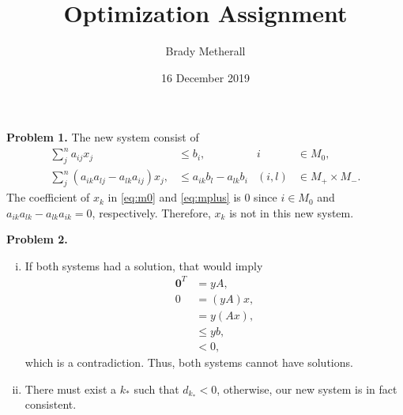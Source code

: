 \documentclass[11pt,a4paper]{article}
\title{Optimization Assignment}
\author{Brady Metherall}
\date{16 December 2019}
\begin{document}
\maketitle


\textbf{Problem 1.}
The new system consist of
\begin{align}
    \sum_j^n a_{ij} x_j &\leq b_i, & i &\in M_0, \label{eq:m0} \\
    \sum_j^n (a_{ik} a_{lj} - a_{lk} a_{ij}) x_j, &\leq a_{ik} b_l - a_{lk} b_i & (i,l) &\in M_+ \times M_-. \label{eq:mplus}
\end{align}
The coefficient of $x_k$ in \eqref{eq:m0} and \eqref{eq:mplus} is 0 since $i \in M_0$ and $a_{ik} a_{lk} - a_{lk} a_{ik} = 0$, respectively. Therefore, $x_k$ is not in this new system.


\textbf{Problem 2.}
\begin{enumerate}[i)]
    \item
    If both systems had a solution, that would imply
    \begin{align*}
        \mathbf{0}^T &= yA, \\
        0 &= (y A) x, \\
        &= y (A x), \\
        &\leq yb, \\
        &< 0,
    \end{align*}
    which is a contradiction. Thus, both systems cannot have solutions.
    \item
    There must exist a $k_*$ such that $d_{k_*} < 0$, otherwise, our new system is in fact consistent.
\end{enumerate}
\end{document}
